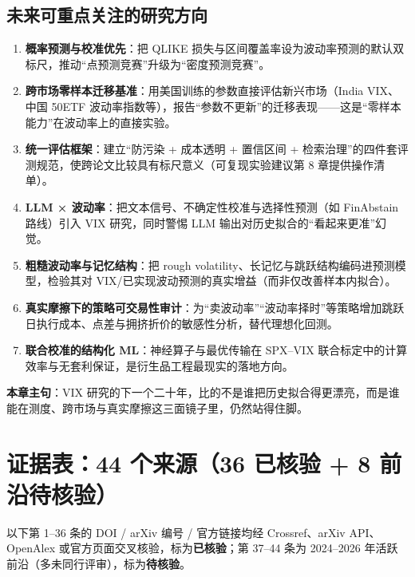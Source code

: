 \documentclass[11pt,a4paper]{article}
\begin{document}
\subsection{未来可重点关注的研究方向}

\begin{enumerate}[leftmargin=2.2em]
  \item \textbf{概率预测与校准优先}：把 QLIKE 损失与区间覆盖率设为波动率预测的默认双标尺，推动“点预测竞赛”升级为“密度预测竞赛”。
  \item \textbf{跨市场零样本迁移基准}：用美国训练的参数直接评估新兴市场（India VIX、中国 50ETF 波动率指数等），报告“参数不更新”的迁移表现——这是“零样本能力”在波动率上的直接实验。
  \item \textbf{统一评估框架}：建立“防污染 + 成本透明 + 置信区间 + 检索治理”的四件套评测规范，使跨论文比较具有标尺意义（可复现实验建议第 8 章提供操作清单）。
  \item \textbf{LLM × 波动率}：把文本信号、不确定性校准与选择性预测（如 FinAbstain 路线）引入 VIX 研究，同时警惕 LLM 输出对历史拟合的“看起来更准”幻觉。
  \item \textbf{粗糙波动率与记忆结构}：把 rough volatility、长记忆与跳跃结构编码进预测模型，检验其对 VIX/已实现波动预测的真实增益（而非仅改善样本内拟合）。
  \item \textbf{真实摩擦下的策略可交易性审计}：为“卖波动率”“波动率择时”等策略增加跳跃日执行成本、点差与拥挤折价的敏感性分析，替代理想化回测。
  \item \textbf{联合校准的结构化 ML}：神经算子与最优传输在 SPX--VIX 联合标定中的计算效率与无套利保证，是衍生品工程最现实的落地方向。
\end{enumerate}

\textbf{本章主句}：VIX 研究的下一个二十年，比的不是谁把历史拟合得更漂亮，而是谁能在测度、跨市场与真实摩擦这三面镜子里，仍然站得住脚。

\newpage
\section{证据表：44 个来源（36 已核验 + 8 前沿待核验）}

以下第 1--36 条的 DOI / arXiv 编号 / 官方链接均经 Crossref、arXiv API、OpenAlex 或官方页面交叉核验，标为\textbf{已核验}；第 37--44 条为 2024--2026 年活跃前沿（多未同行评审），标为\textbf{待核验}。
\end{document}
